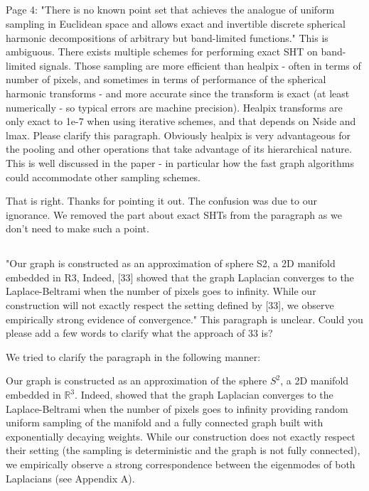 \documentclass[12pt,a4paper]{article}
\newcommand{\mdeff}[1]{{\color[rgb]{.1,.6,.1}{MD: #1}}}
\newcommand{\1}{\b{1}}              %
\newcommand{\0}{\b{0}}              %
\begin{document}
\subsection{}
\begin{mdframed}[style=comment]
Page 4: "There is no known point set that achieves the analogue of uniform sampling in Euclidean space and allows exact and invertible discrete spherical harmonic decompositions of arbitrary but band-limited functions." This is ambiguous. There exists multiple schemes for performing exact SHT on band-limited signals. Those sampling are more efficient than healpix - often in terms of number of pixels, and sometimes in terms of performance of the spherical harmonic transforms - and more accurate since the transform is exact (at least numerically - so typical errors are machine precision). Healpix transforms are only exact to 1e-7 when using iterative schemes, and that depends on Nside and lmax. Please clarify this paragraph. Obviously healpix is very advantageous for the pooling and other operations that take advantage of its hierarchical nature. This is well discussed in the paper - in particular how the fast graph algorithms could accommodate other sampling schemes.
\end{mdframed}

That is right.
Thanks for pointing it out.
The confusion was due to our ignorance.
We removed the part about exact SHTs from the paragraph as we don't need to make such a point.


\subsection{}
\begin{mdframed}[style=comment]
"Our graph is constructed as an approximation of sphere S2, a 2D manifold embedded in R3, Indeed, [33] showed that the graph Laplacian converges to the Laplace-Beltrami when the number of pixels goes to infinity. While our construction will not exactly respect the setting defined by [33], we observe empirically strong evidence of convergence." This paragraph is unclear. Could you please add a few words to clarify what the approach of 33 is?
\end{mdframed}

We tried to clarify the paragraph in the following manner:
\begin{mdframed}[style=manuscript]
Our graph is constructed as an approximation of the sphere $S^2$, a 2D manifold embedded in $\mathbb{R}^3$.
Indeed, \cite{belkin2007convergence} showed that the graph Laplacian converges to the Laplace-Beltrami when the number of pixels goes to infinity providing random uniform sampling of the manifold and a fully connected graph built with exponentially decaying weights.
While our construction does not exactly respect their setting (the sampling is deterministic and the graph is not fully connected), we empirically observe a strong correspondence between the eigenmodes of both Laplacians (see Appendix A).
\end{mdframed}
\end{document}
